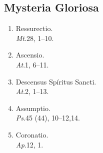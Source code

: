 \subsection*{Mysteria Gloriosa}
\vspace{-0.5em}

\begin{enumerate}[label={\roman*.}, itemsep=0pt]

\item
    Ressurectio.
\\  {\it Mt}.\@ 28, 1--10.  
\item
    Ascensio.
\\  {\it At}.\@ 1, 6--11.
\item
    Descensus Sp\'iritus Sancti.
\\  {\it At}.\@ 2, 1--13.
\item
    Assumptio.
\\  {\it Ps}.\@ 45 (44), 10--12,14.
\item
    Coronatio.
\\  {\it Ap}.\@ 12, 1.
\end{enumerate}